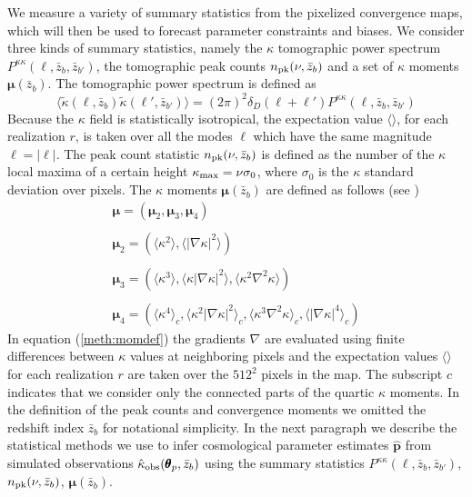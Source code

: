 \documentclass[reprint,aps,prd,superscriptaddress,showkeys,showpacs]{revtex4-1}
\newcommand{\bbh}[1]{\mathbf{\hat{#1}}}
\newcommand{\h}[1]{\hat{#1}}
\begin{document}
We measure a variety of summary statistics from the pixelized convergence maps, which will then be used to forecast parameter constraints and biases. We consider three kinds of summary statistics, namely the $\kappa$ tomographic power spectrum $P^{\kappa\kappa}(\ell,\bar{z}_b,\bar{z}_{b'})$, the tomographic peak counts $n_{\rm pk}(\nu,\bar{z}_b)$ and a set of $\kappa$ moments $\pmb{\mu}(\bar{z}_b)$. The tomographic power spectrum is defined as 
\begin{equation}
\langle\tilde{\kappa}(\pmb{\ell},\bar{z}_b)\tilde{\kappa}(\pmb{\ell}',\bar{z}_{b'})\rangle = (2\pi)^2\delta_D(\pmb{\ell}+\pmb{\ell}')P^{\kappa\kappa}(\ell,\bar{z}_b,\bar{z}_{b'})
\end{equation}
%
Because the $\kappa$ field is statistically isotropical, the expectation value $\langle\rangle$, for each realization $r$, is taken over all the modes $\pmb{\ell}$ which have the same magnitude $\ell=\vert\pmb{\ell}\vert$. The peak count statistic $n_{\rm pk}(\nu,\bar{z}_b)$ is defined as the number of the $\kappa$ local maxima of a certain height $\kappa_{\rm max}=\nu\sigma_0$, where $\sigma_0$ is the $\kappa$ standard deviation over pixels. The $\kappa$ moments $\pmb{\mu}(\bar{z}_b)$ are defined as follows (see \citep{Matsubara10,Munshi12,MinkPetri}) 
%
\begin{equation}
\label{meth:momdef}
\begin{matrix}
\pmb{\mu} = (\pmb{\mu}_2,\pmb{\mu}_3,\pmb{\mu}_4) \\ \\
\pmb{\mu}_2 = (\langle\kappa^2\rangle,\langle\vert\nabla\kappa\vert^2\rangle) \\ \\
\pmb{\mu}_3 = (\langle\kappa^3\rangle,\langle\kappa\vert\nabla\kappa\vert^2\rangle,\langle\kappa^2\nabla^2\kappa\rangle) \\ \\
\pmb{\mu}_4 = (\langle\kappa^4\rangle_c,\langle\kappa^2\vert\nabla\kappa\vert^2\rangle_c,\langle\kappa^3\nabla^2\kappa\rangle_c,\langle\vert\nabla\kappa\vert^4\rangle_c)
\end{matrix}
\end{equation}
%
In equation (\ref{meth:momdef}) the gradients $\nabla$ are evaluated using finite differences between $\kappa$ values at neighboring pixels and the expectation values $\langle\rangle$ for each realization $r$ are taken over the $512^2$ pixels in the map. The subscript $c$ indicates that we consider only the connected parts of the quartic $\kappa$ moments. In the definition of the peak counts and convergence moments we omitted the redshift index $\bar{z}_b$ for notational simplicity. In the next paragraph we describe the statistical methods we use to infer cosmological parameter estimates $\bbh{p}$ from simulated observations $\h{\kappa}_{\rm obs}(\pmb{\theta}_p,\bar{z}_b)$ using the summary statistics $P^{\kappa\kappa}(\ell,\bar{z}_b,\bar{z}_{b'})$, $n_{\rm pk}(\nu,\bar{z}_b)$, $\pmb{\mu}(\bar{z}_b)$.   
\end{document}

